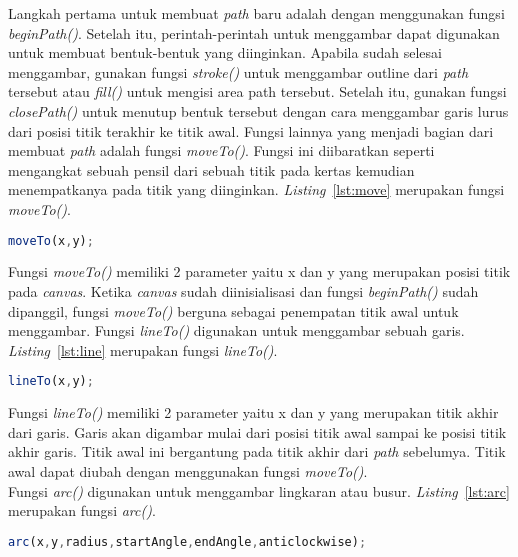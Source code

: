 Langkah pertama untuk membuat \textit{path} baru adalah dengan menggunakan fungsi \textit{beginPath()}. Setelah itu, perintah-perintah untuk menggambar dapat digunakan untuk membuat bentuk-bentuk yang diinginkan. Apabila sudah selesai menggambar, gunakan fungsi \textit{stroke()} untuk menggambar outline dari \textit{path} tersebut atau \textit{fill()} untuk mengisi area path tersebut. Setelah itu, gunakan fungsi \textit{closePath()} untuk menutup bentuk tersebut dengan cara menggambar garis lurus dari posisi titik terakhir ke titik awal. Fungsi lainnya yang menjadi bagian dari membuat \textit{path} adalah fungsi \textit{moveTo()}. Fungsi ini diibaratkan seperti mengangkat sebuah pensil dari sebuah titik pada kertas kemudian menempatkanya pada titik yang diinginkan. \textit{Listing}~\ref{lst:move} merupakan fungsi \textit{moveTo()}.

\begin{lstlisting}[language=Javascript, caption=Fungsi \textit{moveTo()}, label={lst:move}]
	moveTo(x,y);
\end{lstlisting}

Fungsi \textit{moveTo()} memiliki 2 parameter yaitu x dan y yang merupakan posisi titik pada \textit{canvas}. Ketika \textit{canvas} sudah diinisialisasi dan fungsi \textit{beginPath()} sudah dipanggil, fungsi \textit{moveTo()} berguna sebagai penempatan titik awal untuk menggambar. Fungsi \textit{lineTo()} digunakan untuk menggambar sebuah garis. \textit{Listing}~\ref{lst:line} merupakan fungsi \textit{lineTo()}.

\begin{lstlisting}[language=Javascript, caption=Fungsi \textit{lineTo()}, label={lst:line}]
	lineTo(x,y);
\end{lstlisting}

Fungsi \textit{lineTo()} memiliki 2 parameter yaitu x dan y yang merupakan titik akhir dari garis. Garis akan digambar mulai dari posisi titik awal sampai ke posisi titik akhir garis. Titik awal ini bergantung pada titik akhir dari \textit{path} sebelumya. Titik awal dapat diubah dengan menggunakan fungsi \textit{moveTo()}.\\

Fungsi \textit{arc()} digunakan untuk menggambar lingkaran atau busur. \textit{Listing}~\ref{lst:arc} merupakan fungsi \textit{arc()}.

\begin{lstlisting}[language=Javascript, caption=Fungsi \textit{arc()}, label={lst:arc}]
	arc(x,y,radius,startAngle,endAngle,anticlockwise);
\end{lstlisting}


